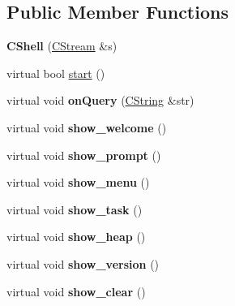 \subsection*{Public Member Functions}
\begin{DoxyCompactItemize}
\item 
\hypertarget{class_c_shell_a66915a194065db1d82873d79ee6ec8c6}{{\bfseries C\-Shell} (\hyperlink{class_c_stream}{C\-Stream} \&s)}\label{class_c_shell_a66915a194065db1d82873d79ee6ec8c6}

\item 
virtual bool \hyperlink{class_c_shell_a670f66f552494dfce94ee297ae0f659a}{start} ()
\item 
\hypertarget{class_c_shell_a16e1dae0dedda35c0be64d1c8f40e6b4}{virtual void {\bfseries on\-Query} (\hyperlink{class_c_string}{C\-String} \&str)}\label{class_c_shell_a16e1dae0dedda35c0be64d1c8f40e6b4}

\item 
\hypertarget{class_c_shell_a34dfa6d370ce6fb517e1307d38a4982b}{virtual void {\bfseries show\-\_\-welcome} ()}\label{class_c_shell_a34dfa6d370ce6fb517e1307d38a4982b}

\item 
\hypertarget{class_c_shell_a7adec131871fb1931300eb0f6b31b3f5}{virtual void {\bfseries show\-\_\-prompt} ()}\label{class_c_shell_a7adec131871fb1931300eb0f6b31b3f5}

\item 
\hypertarget{class_c_shell_ab499caffc2baf478802c3f89d606fc6c}{virtual void {\bfseries show\-\_\-menu} ()}\label{class_c_shell_ab499caffc2baf478802c3f89d606fc6c}

\item 
\hypertarget{class_c_shell_ac9f0aa22624f3168256f6b6c851ec885}{virtual void {\bfseries show\-\_\-task} ()}\label{class_c_shell_ac9f0aa22624f3168256f6b6c851ec885}

\item 
\hypertarget{class_c_shell_a99cd1946dd501dd788accc421ffb883c}{virtual void {\bfseries show\-\_\-heap} ()}\label{class_c_shell_a99cd1946dd501dd788accc421ffb883c}

\item 
\hypertarget{class_c_shell_a4aed8c6a1e01a50595d9e8da8d1f88b2}{virtual void {\bfseries show\-\_\-version} ()}\label{class_c_shell_a4aed8c6a1e01a50595d9e8da8d1f88b2}

\item 
\hypertarget{class_c_shell_a8cb6ac07d2290e4d51c641af1d152b1f}{virtual void {\bfseries show\-\_\-clear} ()}\label{class_c_shell_a8cb6ac07d2290e4d51c641af1d152b1f}


\end{DoxyCompactItemize}
